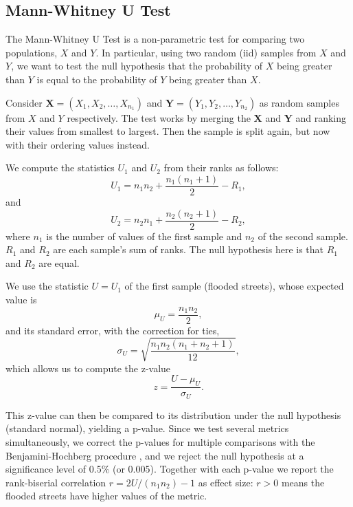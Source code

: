 \documentclass[sn-nature]{sn-jnl}%
\theoremstyle{thmstyleone}%
\theoremstyle{thmstyletwo}%
\theoremstyle{thmstylethree}%
\begin{document}
\subsection{Mann-Whitney U Test}

The Mann-Whitney U Test is a non-parametric test for comparing two populations, $X$ and $Y$.
In particular, using two random (iid) samples from $X$ and $Y$, we want to test the null hypothesis that the probability of $X$ being greater than $Y$ is equal to the probability of $Y$ being greater than $X$.

Consider $\boldsymbol{X} = (X_1, X_2, \ldots, X_{n_1})$ and $\boldsymbol{Y} = (Y_1, Y_2, \ldots, Y_{n_2})$ as random samples from $X$ and $Y$ respectively.
The test works by merging the $\boldsymbol{X}$ and $\boldsymbol{Y}$ and ranking their values from smallest to largest.
Then the sample is split again, but now with their ordering values instead.

We compute the statistics $U_1$ and $U_2$ from their ranks as follows:
\begin{equation}
U_1 = n_1 n_2  + \frac{n_1(n_1+1)}{2} - R_1,
\end{equation}
and
\begin{equation}
    U_2 = n_2 n_1  + \frac{n_2(n_2+1)}{2} - R_2,
\end{equation}
where $n_1$ is the number of values of the first sample and $n_2$ of the second sample. $R_1$ and $R_2$ are each sample's sum of ranks.
The null hypothesis here is that $R_1$ and $R_2$ are equal.

We use the statistic $U = U_1$ of the first sample (flooded streets), whose expected value is
\begin{equation}
    \mu_U = \frac{n_1n_2}{2},
\end{equation}
and its standard error, with the correction for ties,
\begin{equation}
    \sigma_U = \sqrt{\frac{n_1n_2(n_1+n_2+1)}{12}},
\end{equation}
which allows us to compute the z-value
\begin{equation}
    z = \frac{U - \mu_U}{\sigma_U}.
\end{equation}

This z-value can then be compared to its distribution under the null hypothesis (standard normal), yielding a p-value. Since we test several metrics simultaneously, we correct the p-values for multiple comparisons with the Benjamini-Hochberg procedure \cite{benjamini1995}, and we reject the null hypothesis at a significance level of 0.5\% (or 0.005).
Together with each p-value we report the rank-biserial correlation $r = 2U/(n_1 n_2) - 1$ as effect size: $r > 0$ means the flooded streets have higher values of the metric.
\end{document}
